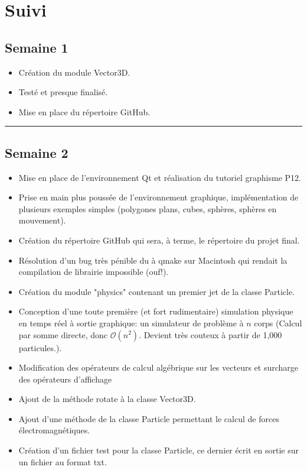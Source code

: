 \documentclass[12pt, letterpaper, twoside]{article}
\begin{document}
\section{Suivi}

\subsection*{Semaine 1}
\begin{itemize}
\item Création du module Vector3D.
\item Testé et presque finalisé.
\item Mise en place du répertoire GitHub.
\end{itemize}

\rule{\textwidth}{0.4pt}

\subsection*{Semaine 2}
\begin{itemize}
	\item Mise en place de l’environnement Qt et réalisation du tutoriel graphisme P12.
	\item Prise en main plus poussée de l’environnement graphique, implémentation de plusieurs exemples simples (polygones plans, cubes, sphères, sphères en mouvement).
	\item Création du répertoire GitHub qui sera, à terme, le répertoire du projet final.
	\item Résolution d’un bug très pénible du à qmake sur Macintosh qui rendait la compilation de librairie impossible (ouf!).
	\item Création du module "physics" contenant un premier jet de la classe Particle.
	\item Conception d’une toute première (et fort rudimentaire) simulation physique en temps réel à sortie graphique: un simulateur de problème à $n$ corps (Calcul par somme directe, donc $\mathcal{O}(n^2)$. Devient très couteux à partir de 1,000 particules.).
	\item Modification des opérateurs de calcul algébrique sur les vecteurs et surcharge des opérateurs d’affichage
	\item Ajout de la méthode rotate à la classe Vector3D.
	\item Ajout d'une méthode de la classe Particle permettant le calcul de forces électromagnétiques.
	\item Création d’un fichier test pour la classe Particle, ce dernier écrit en sortie sur un fichier au format txt.
\end{itemize}
\end{document}
